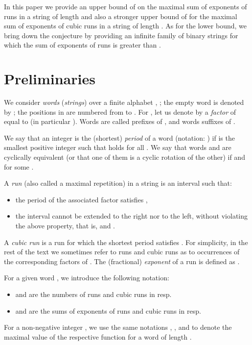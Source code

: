 \documentclass{llncs}
\begin{document}
    In this paper we provide an upper bound of  on the maximal sum of exponents
    of runs in a string of length  and also a stronger upper bound of  for the
    maximal sum of exponents of cubic runs in a string of length .
    As for the lower bound, we bring down the conjecture  by
    providing an infinite family of binary strings for which the sum of exponents of runs is greater than
    .


  \section{Preliminaries}
    We consider \emph{words} (\emph{strings})  over a finite alphabet , ;
    the empty word is denoted by ;
    the positions in  are numbered from  to .
For , let us denote by  a \textit{factor}
    of  equal to  (in particular ).
Words  are called prefixes of , and words  suffixes of .

    We say that an integer  is the (shortest) \emph{period} of a word
     (notation: ) if  is the smallest positive integer such
    that  holds for all .
We say that words  and  are cyclically equivalent (or that one of them is a cyclic
    rotation of the other) if  and  for some .


    A \emph{run} (also called a maximal repetition) in a string  is an interval
     such that:
    \begin{itemize}
      \item
        the period  of the associated factor  satisfies
        , 
      \item 
        the interval cannot be extended to the right nor to the left, without violating the above property, 
        that is,  and .
    \end{itemize}
    A \emph{cubic run} is a run  for which the
    shortest period  satisfies .
    For simplicity, in the rest of the text we sometimes refer to runs and cubic runs as
    to occurrences of the corresponding factors of .
    The (fractional) \emph{exponent} of a run is defined as .

    For a given word , we introduce the following notation:
    \begin{itemize}
      \item  and  are the numbers of runs and cubic
      runs in  resp.
      \item  and  are the sums of exponents of runs and cubic
      runs in  resp.
    \end{itemize}
    For a non-negative integer , we use the same notations , ,
     and  to denote the maximal value of the respective function
    for a word of length .
\end{document}
